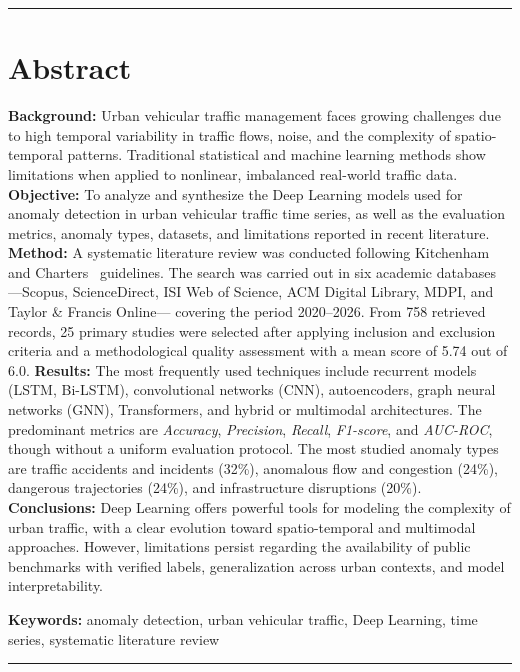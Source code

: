 \documentclass[12pt, a4paper]{article}
\begin{document}
\vspace{0.5em}\noindent\rule{\linewidth}{0.4pt}

\section*{Abstract}
\noindent
\textbf{Background:} Urban vehicular traffic management faces growing challenges due to high temporal variability in traffic flows, noise, and the complexity of spatio-temporal patterns. Traditional statistical and machine learning methods show limitations when applied to nonlinear, imbalanced real-world traffic data. \textbf{Objective:} To analyze and synthesize the Deep Learning models used for anomaly detection in urban vehicular traffic time series, as well as the evaluation metrics, anomaly types, datasets, and limitations reported in recent literature. \textbf{Method:} A systematic literature review was conducted following Kitchenham and Charters~\cite{Kitchenham2007} guidelines. The search was carried out in six academic databases ---Scopus, ScienceDirect, ISI Web of Science, ACM Digital Library, MDPI, and Taylor \& Francis Online--- covering the period 2020--2026. From 758 retrieved records, 25 primary studies were selected after applying inclusion and exclusion criteria and a methodological quality assessment with a mean score of 5.74 out of 6.0. \textbf{Results:} The most frequently used techniques include recurrent models (LSTM, Bi-LSTM), convolutional networks (CNN), autoencoders, graph neural networks (GNN), Transformers, and hybrid or multimodal architectures. The predominant metrics are \textit{Accuracy}, \textit{Precision}, \textit{Recall}, \textit{F1-score}, and \textit{AUC-ROC}, though without a uniform evaluation protocol. The most studied anomaly types are traffic accidents and incidents (32\%), anomalous flow and congestion (24\%), dangerous trajectories (24\%), and infrastructure disruptions (20\%). \textbf{Conclusions:} Deep Learning offers powerful tools for modeling the complexity of urban traffic, with a clear evolution toward spatio-temporal and multimodal approaches. However, limitations persist regarding the availability of public benchmarks with verified labels, generalization across urban contexts, and model interpretability.

\vspace{0.4em}
\noindent\textbf{Keywords:} anomaly detection, urban vehicular traffic, Deep Learning, time series, systematic literature review
\noindent\rule{\linewidth}{1pt}\vspace{1em}
\end{document}

